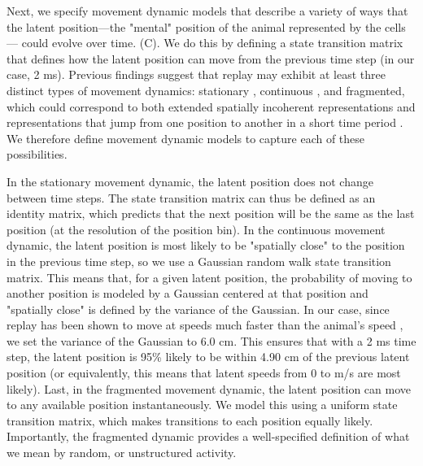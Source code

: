\documentclass[9pt,lineno]{elife}
\begin{document}
Next, we specify movement dynamic models that describe a variety of ways that the latent position---the "mental" position of the animal represented by the cells--- could evolve over time. (C). We do this by defining a state transition matrix that defines how the latent position can move from the previous time step (in our case, 2 ms). Previous findings suggest that replay may exhibit at least three distinct types of movement dynamics: stationary \citep{YuDistincthippocampalcorticalmemory2017, FarooqEmergencepreconfiguredplastic2019, MuessigCoordinatedEmergenceHippocampal2019}, continuous \citep{DavidsonHippocampalReplayExtended2009}, and fragmented, which could correspond to both extended spatially incoherent representations and representations that jump from one position to another in a short time period \citep{PfeifferAutoassociativedynamicsgeneration2015}. We therefore define movement dynamic models to capture each of these possibilities.

In the stationary movement dynamic, the latent position does not change between time steps. The state transition matrix can thus be defined as an identity matrix, which predicts that the next position will be the same as the last position (at the resolution of the position bin). In the continuous movement dynamic, the latent position is most likely to be "spatially close" to the position in the previous time step, so we use a Gaussian random walk state transition matrix. This means that, for a given latent position, the probability of moving to another position is modeled by a Gaussian centered at that position and "spatially close" is defined by the variance of the Gaussian. In our case, since replay has been shown to move at speeds much faster than the animal's speed \citep{DavidsonHippocampalReplayExtended2009, PfeifferAutoassociativedynamicsgeneration2015}, we set the variance of the Gaussian to 6.0 cm. This ensures that with a 2 ms time step, the latent position is 95\% likely to be within 4.90 cm of the previous latent position (or equivalently, this means that latent speeds from 0 to  m/s are most likely). Last, in the fragmented movement dynamic, the latent position can move to any available position instantaneously. We model this using a uniform state transition matrix, which makes transitions to each position equally likely. Importantly, the fragmented dynamic provides a well-specified definition of what we mean by random, or unstructured activity.
\end{document}
